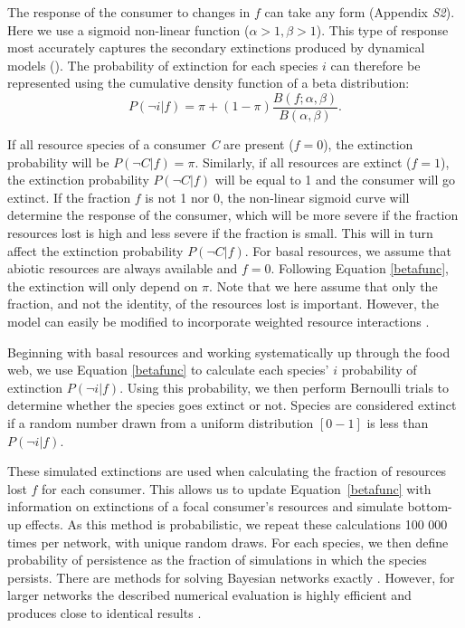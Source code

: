 \documentclass[12pt]{article}
\begin{document}
\begin{spacing}{2.0}
        
        The response of the consumer to changes in $f$ can take any form (Appendix \emph{S2}). Here we use a sigmoid non-linear function ($\alpha > 1, \beta > 1$).
		This type of response most accurately captures the secondary extinctions produced by dynamical models (\citealp[]{Eklof2013}).
		The probability of extinction for each species $i$ can therefore be represented using the cumulative density function of a beta distribution:
		\begin{equation}
		P(\lnot i|f) = \pi + (1 - \pi) \frac{B(f;\alpha,\beta)}{B(\alpha,\beta)}.
				\label{betafunc}
        \end{equation}
		
		If all resource species of a consumer \textit{C} are present ($f = 0$), the extinction probability will be $P(\lnot C|f) = \pi$. 
		Similarly, if all resources are extinct ($f = 1$), the extinction probability $P(\lnot C|f)$ will be equal to 1 and the consumer will go extinct.
		If the fraction $f$ is not 1 nor 0, the non-linear sigmoid curve will determine the response of the consumer, which will be more severe if the fraction resources lost is high and less severe if the fraction is small. This will in turn affect the extinction probability $P(\lnot C|f)$.
		For basal resources, we assume that abiotic resources are always available and $f=0$. Following Equation \ref{betafunc}, the extinction will only depend on $\pi$.
		Note that we here assume that only the fraction, and not the identity, of the resources lost is important. 
		However, the model can easily be modified to incorporate weighted resource interactions \citep[see][]{Eklof2013}.
		
		
        Beginning with basal resources and working systematically up through the food web, we use Equation \ref{betafunc} to calculate each species' $i$ probability of extinction $P(\lnot i|f)$.
        Using this probability, we then perform Bernoulli trials to determine whether the species goes extinct or not. 
        Species are considered extinct if a random number drawn from a uniform distribution $[0-1]$ is less than $P(\lnot i|f)$.


        These simulated extinctions are used when calculating the fraction of resources lost $f$ for each consumer.
        This allows us to update Equation~\ref{betafunc} with information on extinctions of a focal consumer's resources and simulate bottom-up effects. As this method is probabilistic, we repeat these calculations 100 000 times per network, with unique random draws.
	    For each species, we then define probability of persistence as the fraction of simulations in which the species persists. There are methods for solving Bayesian networks exactly \citep{Eklof2013}.
	    However, for larger networks the described numerical evaluation is highly efficient and produces close to identical results \citep{Haussler2020}.
		

\end{spacing}
\end{document}
